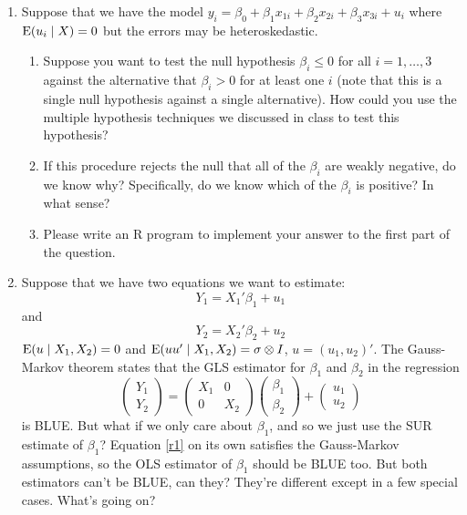 \begin{enumerate}
\item Suppose that we have the model $y_i = \beta_0 + \beta_1 x_{1i} + \beta_2 x_{2i}
  + \beta_3 x_{3i} + u_i$ where $\operatorname{E}(u_i \mid X) = 0$ but the errors may be
  heteroskedastic.

  \begin{enumerate}
  \item Suppose you want to test the null hypothesis $\beta_i \leq 0$ for all
    $i = 1,\dots,3$ against the alternative that $\beta_i > 0$ for at least
    one $i$ (note that this is a single null hypothesis against a
    single alternative).  How could you use the multiple hypothesis
    techniques we discussed in class to test this hypothesis?
  \item If this procedure rejects the null that all of the $\beta_i$ are
    weakly negative, do we know why?  Specifically, do we know which
    of the $\beta_i$ is positive?  In what sense?
  \item Please write an R program to implement your answer to the
    first part of the question.
  \end{enumerate}

\item Suppose that we have two equations we want to estimate:
  \begin{equation}
    \label{r1}
    Y_1 = X_1 '\beta_1 + u_1
  \end{equation}
  and
  \begin{equation}
    \label{r2}
    Y_2 = X_2'\beta_2 + u_2
  \end{equation}
  $\operatorname{E}(u \mid X_1, X_2) = 0$ and $\operatorname{E}(u u' \mid X_1, X_2) = \sigma \otimes I$, $u = (u_1,
  u_2)'$.  The Gauss-Markov theorem states that the GLS estimator for
  $\beta_1$ and $\beta_2$ in the regression
  \begin{equation}
    \label{r3}
    \begin{pmatrix} Y_1 \\ Y_2 \end{pmatrix}
    = \begin{pmatrix} X_1 & 0 \\ 0 & X_2 \end{pmatrix} 
    \begin{pmatrix} \beta_1 \\ \beta_2 \end{pmatrix}
    + \begin{pmatrix} u_1 \\ u_2 \end{pmatrix}
  \end{equation}
  is BLUE.  But what if we only care about $\beta_1$, and so we just use
  the SUR estimate of $\beta_1$?  Equation \eqref{r1} on its own
  satisfies the Gauss-Markov assumptions, so the OLS estimator of $\beta_1$
  should be BLUE too.  But both estimators can't be BLUE, can they?
  They're different except in a few special cases.  What's going on?


\end{enumerate}
